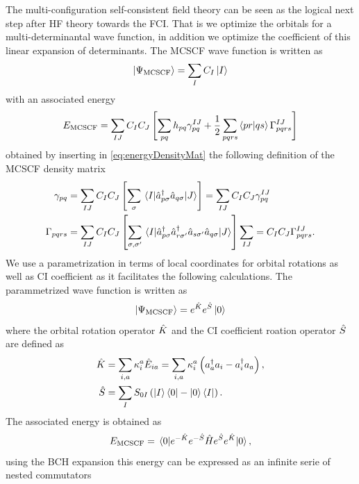 \documentclass[11pt,a4paper]{article}
\newcommand{\hH}{\Hat{H}} %
\newcommand{\hE}{\Hat{E}} %
\newcommand{\hK}{\Hat{K}} %
\newcommand{\hS}{\Hat{S}}
\newcommand{\cre}[1]{a_{#1}^\dagger} %
\newcommand{\ani}[1]{a_{#1}} %
\newcommand{\MCSCF}{\text{MCSCF}}
\begin{document}
The multi-configuration self-consistent field theory can be seen as the logical next step after HF theory towards the FCI.
That is we optimize the orbitals for a multi-determinantal wave function, in addition we optimize the coefficient of this linear expansion of determinants.
The MCSCF wave function is written as
\begin{equation}
  \label{eq:MCSCF_WF}
  \ket{\Psi_{\text{MCSCF}}}=\sum_I C_I \ket{I}
\end{equation}
with an associated energy
\begin{equation}
  \label{eq:MCSCF_NRJ_RDM}
  E_{\MCSCF} = \sum_{IJ}C_IC_J\left[\sum_{pq}h_{pq} \gamma_{pq}^{IJ} + \frac{1}{2}\sum_{pqrs} \braket{pr}{qs} \Gamma_{pqrs}^{IJ}\right]
\end{equation}
obtained by inserting in \eqref{eq:energyDensityMat} the following definition of the MCSCF density matrix
\begin{align}
  \label{eq:MCSCF_1RDM}
  \gamma_{pq}&=\sum_{IJ}C_IC_J\left[\sum_\sigma\mel{I}{\hat{a}_{p\sigma}^\dagger \hat{a}_{q\sigma}}{J}\right]=\sum_{IJ}C_IC_J\gamma_{pq}^{IJ}\\
  \label{eq:MCSCF_2RDM}
  \Gamma_{pqrs}&=\sum_{IJ}C_IC_J\left[\sum_{\sigma,\sigma'}\mel{I}{\hat{a}_{p\sigma}^\dagger\hat{a}_{r\sigma'}^\dagger\hat{a}_{s\sigma'}\hat{a}_{q\sigma}}{J}\right]\sum_{IJ}=C_IC_J\Gamma_{pqrs}^{IJ}.
\end{align}
We use a parametrization in terms of local coordinates for orbital rotations as well as CI coefficient as it facilitates the following calculations. The parammetrized wave function is written as
\begin{equation}
  \label{eq:MCSCF_WF_localCoord}
  \ket{\Psi_{\text{MCSCF}}}=e^{\hK}e^{\hS}\ket{0}
\end{equation}
where the orbital rotation operator $\hK$ and the CI coefficient roation operator $\hS$ are defined as
\begin{align}
  \hK &= \sum_{i,a} \kappa_i^a \hE_{ia} = \sum_{i,a} \kappa_i^a \left( \cre{a}\ani{i} - \cre{i}\ani{a} \right),  \\
  \hS &= \sum_I S_{0I}\left(\ket{I}\bra{0}-\ket{0}\bra{I}\right).
\end{align}
The associated energy is obtained as
\begin{equation}
  \label{eq:MCSCF_NRJ_Exp}
  E_{\text{MCSCF}} = \mel{0}{e^{-\hK}e^{-\hS} \hH e^{\hS}e^{\hK}}{0},
\end{equation}
using the BCH expansion this energy can be expressed as an infinite serie of nested commutators
\end{document}
